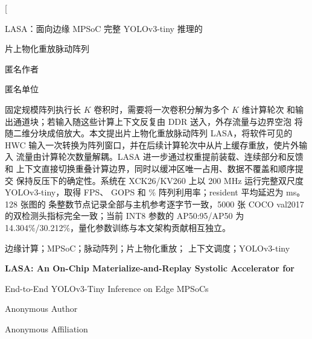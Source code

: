\documentclass[10.5pt,compsoc,UTF8]{CjC}
\newcommand{\LASA}{\textsc{LASA}}
\begin{document}
\thispagestyle{empty}
\twocolumn[
\begin{minipage}{\textwidth}
\begin{center}
\vspace*{2mm}
{\heiti
LASA：面向边缘 MPSoC 完整 YOLOv3-tiny 推理的\par
片上物化重放脉动阵列\par}
\vskip 4mm
{\fangsong 匿名作者\par}
\vskip 1mm
{\songti 匿名单位\par}
\end{center}

\vskip 4mm
\setlength{\baselineskip}{16pt}\selectfont
{}
固定规模阵列执行长 $K$ 卷积时，需要将一次卷积分解为多个 $K$ 维计算轮次
和输出通道块；若输入随这些计算上下文反复由 DDR 送入，外存流量与边界空泡
将随二维分块成倍放大。本文提出片上物化重放脉动阵列 \LASA，将软件可见的
HWC 输入一次转换为阵列窗口，并在后续计算轮次中从片上缓存重放，使片外输入
流量由计算轮次数量解耦。LASA 进一步通过权重提前装载、连续部分和反馈和
上下文直接切换重叠计算边界，同时以缓冲区唯一占用、数据不覆盖和顺序提交
保持反压下的确定性。系统在 XCK26/KV260 上以 200 MHz 运行完整双尺度
YOLOv3-tiny，取得 \ResidentFPS{} FPS、\PLEffectiveGOPS{} GOPS 和
\ArrayUtilization{}\% 阵列利用率；resident 平均延迟为 \ResidentMeanMs{} ms。
128 张图的 \NodeRecords{} 条整数节点记录全部与主机参考逐字节一致，5000 张
COCO val2017 的双检测头指标完全一致；当前 INT8 参数的 AP50:95/AP50 为
14.304\%/30.212\%，量化参数训练与本文架构贡献相互独立。\par

\vspace{2mm}
边缘计算；MPSoC；脉动阵列；片上物化重放；
上下文调度；YOLOv3-tiny\par

\vskip 3mm
\begin{center}
{\bfseries
LASA: An On-Chip Materialize-and-Replay Systolic Accelerator for\par
End-to-End YOLOv3-Tiny Inference on Edge MPSoCs\par}
\vspace{3mm}
{Anonymous Author\par}
{Anonymous Affiliation\par}
\end{center}


\end{minipage}
\end{document}
